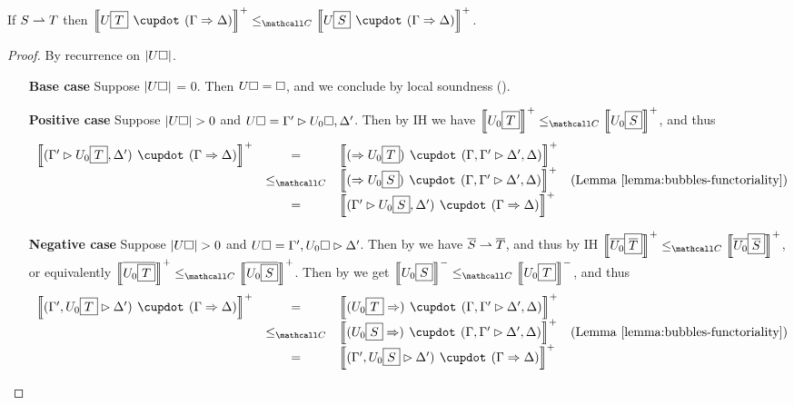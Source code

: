 \begin{lemma}

  If $S \rightharpoonup T$ then $\psint{U\select{T} \mix (\Gamma \seq \Delta)} \sementC
  \psint{U\select{S} \mix (\Gamma \seq \Delta)}$.
\end{lemma}
\begin{proof}
  By recurrence on $\left|U\square\right|$.
  \begin{itemize}
    \item[\textbf{Base case}] Suppose $\left|U\square\right|$ = 0. Then $U\square =
    \square$, and we conclude by local soundness
    ().
    \item[\textbf{Positive case}] Suppose $\left|U\square\right| > 0$ and $U\square =
    \Gamma' \mathbin{\rhd} U_0\square, \Delta'$. Then by IH we have $\psint{U_0\select{T}}
    \sementC \psint{U_0\select{S}}$, and thus
    $$
    \begin{array}{rcll}
      \psint{(\Gamma' \J U_0\select{T}, \Delta') \mix (\Gamma \seq \Delta)}
      &=& \psint{(\seq U_0\select{T}) \mix (\Gamma, \Gamma' \J \Delta', \Delta)} &\\
      &\sementC& \psint{(\seq U_0\select{S}) \mix (\Gamma, \Gamma' \J \Delta', \Delta)} &\text{(\reflemma{bubbles-functoriality})}\\
      &=& \psint{(\Gamma' \J U_0\select{S}, \Delta') \mix (\Gamma \seq \Delta)} &
    \end{array}
    $$

    \item[\textbf{Negative case}] Suppose $\left|U\square\right| > 0$ and $U\square =
    \Gamma', U_0\square \mathbin{\rhd} \Delta'$. Then by  we have
    $\overline{S} \rightharpoonup \overline{T}$, and thus by IH
    $\psint{\soldual{U_0}\select{\soldual{T}}} \sementC
    \psint{\soldual{U_0}\select{\soldual{S}}}$, or equivalently
    $\psint{\soldual{U_0\select{T}}} \sementC \psint{\soldual{U_0\select{S}}}$.
    Then by  we get $\nsint{U_0\select{S}} \sementC
    \nsint{U_0\select{T}}$, and thus
    $$
    \begin{array}{rcll}
      \psint{(\Gamma', U_0\select{T} \J \Delta') \mix (\Gamma \seq \Delta)}
      &=& \psint{(U_0\select{T} \seq) \mix (\Gamma, \Gamma' \J \Delta', \Delta)} &\\
      &\sementC& \psint{(U_0\select{S} \seq) \mix (\Gamma, \Gamma' \J \Delta', \Delta)} &\text{(\reflemma{bubbles-functoriality})}\\
      &=& \psint{(\Gamma', U_0\select{S} \J \Delta') \mix (\Gamma \seq \Delta)} &
    \end{array}
    $$


\end{itemize}
\end{proof}
